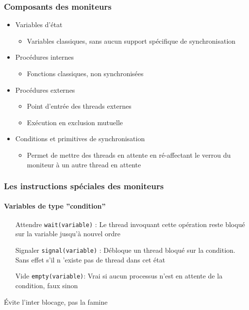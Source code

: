 \begin{frame}
\frametitle{Composants des moniteurs}
\begin{itemize}
\item <1-> Variables d'état
\begin{itemize}
\item Variables classiques, sans aucun support spécifique de synchronisation
\end{itemize}
\item <1-> Procédures internes
\begin{itemize}
\item Fonctions classiques, non synchronisées
\end{itemize}
\item <2-> Procédures externes
\begin{itemize}
\item Point d'entrée des threads externes
\item Exécution en exclusion mutuelle
\end{itemize}
\item <3-> Conditions et primitives de synchronisation\begin{itemize}
\item Permet de mettre des threads en attente en ré-affectant le verrou du moniteur à un autre thread en attente
\end{itemize}
\end{itemize}
\end{frame}

\begin{frame}
\frametitle{Les instructions spéciales des moniteurs}
\framesubtitle{Variables de type ''condition''}
\begin{itemize}
\item [Attendre] \texttt{wait(variable)} : Le thread invoquant cette opération reste bloqué sur la variable jusqu’à nouvel ordre
\item [Signaler] \texttt{signal(variable)} : Débloque un thread bloqué sur la condition. Sans effet s’il n ’existe pas de thread dans cet état
\item [Vide] \texttt{empty(variable)}: Vrai si aucun processus n'est en attente de la condition, faux sinon
\end{itemize}
\end{frame}

\begin{frame}
\begin{multicols}{2}
\begin{scriptsize}\end{scriptsize}
\end{multicols}
\begin{center}
Évite l’inter blocage, pas la famine
\end{center}
\end{frame}

